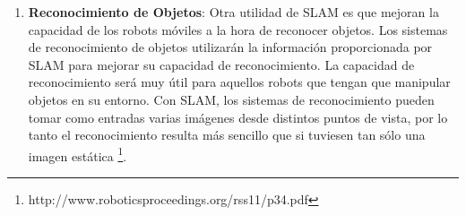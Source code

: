\begin {enumerate}
\begin{figure}[H]
\begin{center}
\hspace{0.5cm}
\hspace{0.5cm}
\end{center}
\caption{El Robot Gita siguiendo a su dueño (a) El cinturón con cámaras estéreo (b) La capacidad de carga del robot Gita (c)}
\label{fig:gita}
\end{figure}


\item \textbf{Reconocimiento de Objetos}: Otra utilidad de SLAM es que mejoran la capacidad de los robots móviles a la hora de reconocer objetos. Los sistemas de reconocimiento de objetos utilizarán la información proporcionada por SLAM para mejorar su capacidad de reconocimiento. La capacidad de reconocimiento será muy útil para aquellos robots que tengan que manipular objetos en su entorno. Con SLAM, los sistemas de reconocimiento pueden tomar como entradas varias imágenes desde distintos puntos de vista, por lo tanto el reconocimiento resulta más sencillo que si tuviesen tan sólo una imagen estática \footnote{http://www.roboticsproceedings.org/rss11/p34.pdf}.


\end{enumerate}
